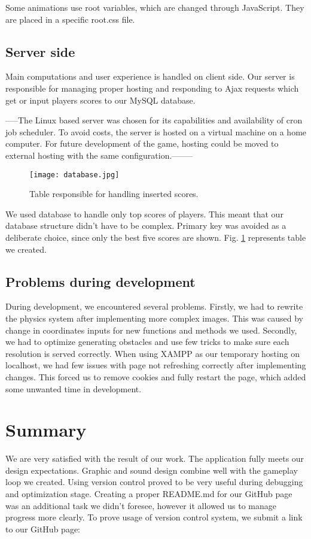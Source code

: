 \documentclass[oneside,a4paper,11pt]{report}
\begin{document}
\par
Some animations use root variables, which are changed through JavaScript. They are placed in a specific root.css file.

\section{Server side}
Main computations and user experience is handled on client side. Our server is responsible for managing proper hosting and responding to Ajax requests which get or input players scores to our MySQL database.

\par
-----The Linux based server was chosen for its capabilities and availability of cron job scheduler. To avoid costs, the server is hosted on a virtual machine on a home computer. For future development of the game, hosting could be moved to external hosting with the same configuration.--------

\begin{figure}[!htb]
	\centering
	\texttt{[image: database.jpg]}
	\caption{Table responsible for handling inserted scores.\label{fig:database}}
\end{figure}

\par
We used database to handle only top scores of players. This meant that our database structure didn't have to be complex. Primary key was avoided as a deliberate choice, since only the best five scores are shown. Fig. \ref{fig:database} represents table we created.

\section{Problems during development}
During development, we encountered several problems. Firstly, we had to rewrite the physics system after implementing more complex images. This was caused by change in coordinates inputs for new functions and methods we used. Secondly, we had to optimize generating obstacles and use few tricks to make sure each resolution is served correctly. When using XAMPP as our temporary hosting on localhost, we had few issues with page not refreshing correctly after implementing changes. This forced us to remove cookies and fully restart the page, which added some unwanted time in development.

\chapter{Summary}
We are very satisfied with the result of our work. The application fully meets our design expectations. Graphic and sound design combine well with the gameplay loop we created. Using version control proved to be very useful during debugging and optimization stage. Creating a proper README.md for our GitHub page was an additional task we didn’t foresee, however it allowed us to manage progress more clearly. To prove usage of version control system, we submit a link to our GitHub page:
\end{document}
